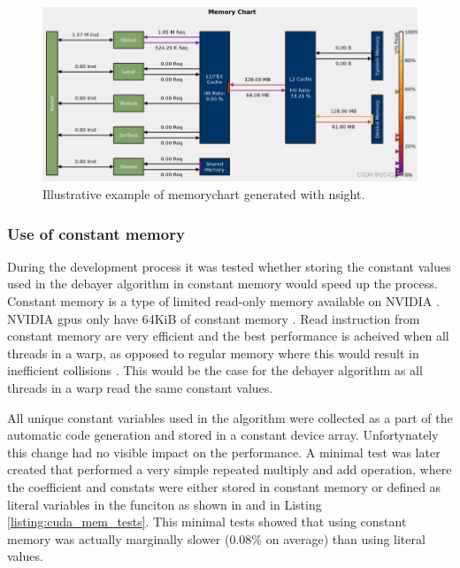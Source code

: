 \begin{figure}[H]
    \centering
    \includegraphics[width=\textwidth]{figures/cuda/cache_hits.png}
    \caption{Illustrative example of memorychart generated with \gls{nsight}. \cite{nv-computeNsightComputeMemory2022}}
    \label{fig:cache_hits}
\end{figure}



\subsubsection{Use of constant memory}
During the development process it was tested whether storing the constant values used in the debayer algorithm in constant memory would speed up the process.
Constant memory is a type of limited read-only memory available on NVIDIA  \cite[61]{nvidiaCUDABestPractices2023}.
NVIDIA \glspl{gpu} only have 64KiB of constant memory \cite[61]{nvidiaCUDABestPractices2023}.
Read instruction from constant memory are very efficient and the best performance is acheived when all threads in a warp, as opposed to regular memory where this would result in inefficient collisions \cite[61]{nvidiaCUDABestPractices2023} \cite[13,14]{volkovLatencyHiding2016}.
This would be the case for the debayer algorithm as all threads in a warp read the same constant values.

All unique constant variables used in the algorithm were collected as a part of the automatic code generation and stored in a constant device array.
Unfortynately this change had no visible impact on the performance.
A minimal test was later created that performed a very simple repeated multiply and add operation, where the coefficient and constats were either stored in constant memory or defined as literal variables in the funciton as shown in  and  in Listing \ref{listing:cuda_mem_tests}.
This minimal tests showed that using constant memory was actually marginally slower (0.08\% on average) than using literal values.

